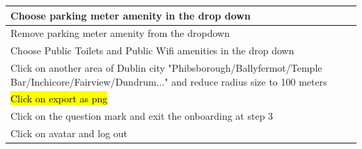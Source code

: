 \documentclass{report}
\begin{document}
\begin{table}[h!]
\begin{tabularx}{\textwidth}{|p{}|X|X|}
        Choose parking meter amenity in the drop down                                                                                                  &                     &                     \\ \hline
        Remove parking meter amenity from the dropdown                                                                                                 &                     &                     \\ \hline
        Choose Public Toilets and Public Wifi amenities in the drop down                                                                               &                     &                     \\ \hline
        Click on another area of Dublin city "Phibsborough/Ballyfermot/Temple Bar/Inchicore/Fairview/Dundrum..." and reduce radius size to 100 meters  &                     &                     \\ \hline
        \hl{Click on export as png}                                                                                                                    &                     &                     \\ \hline
        Click on the question mark and exit the onboarding at step 3                                                                                   &                     &                     \\ \hline
        Click on avatar and log out                                                                                                                    &                     &                     \\ \hline
    \end{tabularx}
\end{table}
\end{document}
